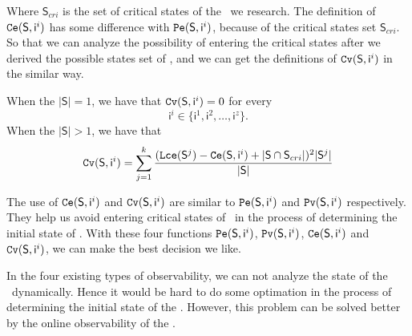 Where $\mathsf{S}_{cri}$ is the set of critical states of the \BCN\ we research. The definition of ${\tt Ce}(\mathsf{S}, \mathsf{ i}^{i})$ has some difference with ${\tt Pe}(\mathsf{S}, \mathsf{ i}^{i})$, because of the critical states set $\mathsf{S}_{cri}$. So that we can analyze the possibility of entering the critical states after we derived the possible states set of \BCNs, and we can get the definitions of ${\tt Cv}(\mathsf{S}, \mathsf{ i}^{i})$ in the similar way. %

\begin{definition} 
When the $|\mathsf{S}|=1$, we have that
${\tt Cv}(\mathsf{S}, \mathsf{ i}^{i})=0$ for every  \[\mathsf{ i}^{i} \in \{\mathsf{ i}^{1},\mathsf{ i}^{2},\ldots, \mathsf{ i}^{z}\}.\]   When the $|\mathsf{S}|>1$, 
we have that  \\
\begin{equation}
\begin{split}
{\tt Cv}(\mathsf{S}, \mathsf{ i}^{i})=\sum_{j=1}^k\frac{ ({\tt Lce}(\mathsf{S}^{j})-{\tt Ce}(\mathsf{S}, \mathsf{ i}^{i})+|\mathsf{S} \cap \mathsf{S}_{cri}|)^2 |\mathsf{S}^{j}|}{ |\mathsf{S}|}
\end{split}
\end{equation}
\end{definition}

The use of ${\tt Ce}(\mathsf{S}, \mathsf{ i}^{i})$ and ${\tt Cv}(\mathsf{S}, \mathsf{ i}^{i})$ are similar to ${\tt Pe}(\mathsf{S}, \mathsf{ i}^{i})$ and ${\tt Pv}(\mathsf{S}, \mathsf{ i}^{i})$ respectively. They help us avoid entering critical states of \BCNs\ in the process of determining the initial state of \BCNs. With these four functions ${\tt Pe}(\mathsf{S}, \mathsf{ i}^{i})$, ${\tt Pv}(\mathsf{S}, \mathsf{ i}^{i})$, ${\tt Ce}(\mathsf{S}, \mathsf{ i}^{i})$ and ${\tt Cv}(\mathsf{S}, \mathsf{ i}^{i})$, we can make the best decision we like. 

In the four existing types of observability, we can not analyze the state of the \BCNs\ dynamically. Hence it would be hard to do some optimation in the process of determining the initial state of the \BCNs. However, this problem can be solved better by the online observability of the \BCNs.